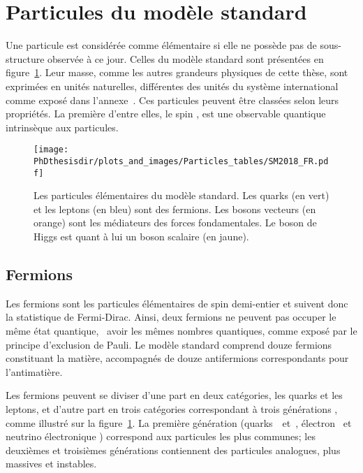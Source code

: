 \section{Particules du modèle standard}\label{chapter-MS-MSSM-section-SM_ptcs}
Une particule est considérée comme élémentaire si elle ne possède pas de sous-structure observée à ce jour. %
Celles du modèle standard sont présentées en figure~\ref{fig-MS-table}.
Leur masse, comme les autres grandeurs physiques de cette thèse, sont exprimées en unités naturelles,
différentes des unités du système international comme exposé dans l'annexe~.
Ces particules peuvent être classées selon leurs propriétés.
La première d'entre elles, le \og spin \fg, est une observable quantique intrinsèque aux particules.
\begin{figure}[h]
\centering
\texttt{[image: \\PhDthesisdir/plots\_and\_images/Particles\_tables/SM2018\_FR.pdf]}
\caption[Les particules élémentaires du modèle standard.]{Les particules élémentaires du modèle standard. Les quarks (en vert) et les leptons (en bleu) sont des fermions. Les bosons vecteurs (en orange) sont les médiateurs des forces fondamentales. Le boson de Higgs est quant à lui un boson scalaire (en jaune).}
\label{fig-MS-table}
\end{figure}

\subsection{Fermions}\label{chapter-MS-MSSM-section-SM_ptcs-subsec-fermions}
Les fermions sont les particules élémentaires de spin demi-entier et suivent donc la statistique de Fermi-Dirac.
Ainsi, deux fermions ne peuvent pas occuper le même état quantique,
\ie\ avoir les mêmes nombres quantiques,
comme exposé par le principe d'exclusion de Pauli.
Le modèle standard comprend douze fermions constituant la matière, accompagnés de douze antifermions correspondants pour l'antimatière.
\par Les fermions peuvent se diviser d'une part en deux catégories, les quarks et les leptons, et d'autre part en trois catégories correspondant à trois \og générations \fg, comme illustré sur la figure~\ref{fig-MS-table}. La première génération (quarks~\quarku\ et~\quarkd, électron \electron\ et neutrino électronique \nuele) correspond aux particules les plus communes; les deuxièmes et troisièmes générations contiennent des particules analogues, plus massives et instables.


